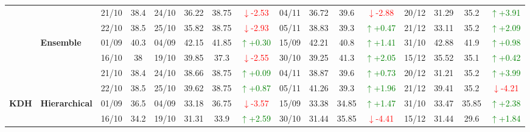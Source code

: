 \documentclass{ieeeaccess}
\begin{document}
{\begin{longtable}{llcc|cccc|cccc|cccc}
& 
& 21/10 & 38.4 & 24/10 & 36.22 & 38.75 & \textcolor{red}{\(\downarrow\)-2.53} & 04/11 & 36.72 & 39.6 & \textcolor{red}{\(\downarrow\)-2.88} & 20/12 & 31.29 & 35.2 & \textcolor{green}{\(\uparrow\)+3.91} \\

&
& 22/10 & 38.5 & 25/10 & 35.82 & 38.75 & \textcolor{red}{\(\downarrow\)-2.93} & 05/11 & 38.83 & 39.3 & \textcolor{green}{\(\uparrow\)+0.47} & 21/12 & 33.11 & 35.2 & \textcolor{green}{\(\uparrow\)+2.09} \\
\cmidrule(lr){2-16}


& \textbf{Ensemble}
& 01/09 & 40.3 & 04/09 & 42.15 & 41.85 & \textcolor{green}{\(\uparrow\)+0.30} & 15/09 & 42.21 & 40.8 & \textcolor{green}{\(\uparrow\)+1.41} & 31/10 & 42.88 & 41.9 & \textcolor{green}{\(\uparrow\)+0.98} \\

& 
& 16/10 & 38 & 19/10 & 39.85 & 37.3 & \textcolor{red}{\(\downarrow\)-2.55} & 30/10 & 39.25 & 41.3 & \textcolor{green}{\(\uparrow\)+2.05} & 15/12 & 35.52 & 35.1 & \textcolor{green}{\(\uparrow\)+0.42} \\

& 
& 21/10 & 38.4 & 24/10 & 38.66 & 38.75 & \textcolor{green}{\(\uparrow\)+0.09} & 04/11 & 38.87 & 39.6 & \textcolor{green}{\(\uparrow\)+0.73} & 20/12 & 31.21 & 35.2 & \textcolor{green}{\(\uparrow\)+3.99} \\

&
& 22/10 & 38.5 & 25/10 & 39.62 & 38.75 & \textcolor{green}{\(\uparrow\)+0.87} & 05/11 & 41.26 & 39.3 & \textcolor{green}{\(\uparrow\)+1.96} & 21/12 & 39.41 & 35.2 & \textcolor{red}{\(\downarrow\)-4.21} \\
\midrule



\multirow{12}{*}{\textbf{KDH}} 
& \textbf{Hierarchical}
& 01/09 & 36.5 & 04/09 & 33.18 & 36.75 & \textcolor{red}{\(\downarrow\)-3.57} & 15/09 & 33.38 & 34.85 & \textcolor{green}{\(\uparrow\)+1.47} & 31/10 & 33.47 & 35.85 & \textcolor{green}{\(\uparrow\)+2.38} \\

&
& 16/10 & 34.2 & 19/10 & 31.31 & 33.9 & \textcolor{green}{\(\uparrow\)+2.59} & 30/10 & 31.44 & 35.85 & \textcolor{red}{\(\downarrow\)-4.41} & 15/12 & 31.44 & 29.6 & \textcolor{green}{\(\uparrow\)+1.84} \\


\end{longtable}}
\end{document}

